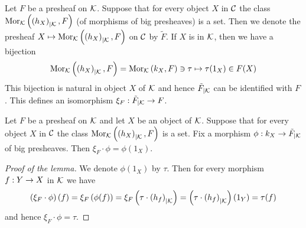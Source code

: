 \noindent
Let $F$ be a presheaf on ${\mathcal K}$. Suppose that for every object $X$ in ${\mathcal C}$ the class $\mathrm{Mor}_{{\mathcal K}}\left(\left(h_X\right)_{\mid {\mathcal K}},F\right)$ (of morphisms of big presheaves) is a set. Then we denote the presheaf $X\mapsto \mathrm{Mor}_{{\mathcal K}}\left(\left(h_X\right)_{\mid {\mathcal K}},F\right)$ on ${\mathcal C}$ by $\tilde{F}$. If $X$ is in ${\mathcal K}$, then we have a bijection
$$\mathrm{Mor}_{{\mathcal K}}\left(\left(h_X\right)_{\mid {\mathcal K}},F\right) = \mathrm{Mor}_{{\mathcal K}}\left(k_X , F\right)\ni \tau \mapsto \tau(1_X)\in F(X)$$
This bijection is natural in object $X$ of ${\mathcal K}$ and hence $\tilde{F}_{\mid {\mathcal K}}$ can be identified with $F$. This defines an isomorphism $\xi_F:\tilde{F}_{\mid {\mathcal K}}\rightarrow F$.

\begin{lemma}\label{lemma:counitandsection}
Let $F$ be a presheaf on ${\mathcal K}$ and let $X$ be an object of ${\mathcal K}$. Suppose that for every object $X$ in ${\mathcal C}$ the class $\mathrm{Mor}_{{\mathcal K}}\left(\left(h_X\right)_{\mid {\mathcal K}},F\right)$ is a set. Fix a morphism $\phi:k_X\rightarrow \tilde{F}_{\mid {\mathcal K}}$ of big presheaves. Then $\xi_F\cdot \phi = \phi(1_X)$.
\end{lemma}
\begin{proof}[Proof of the lemma]
We denote $\phi(1_X)$ by $\tau$. Then for every morphism $f:Y\rightarrow X$ in ${\mathcal K}$ we have
$$\left(\xi_{F}\cdot \phi\right)(f) = \xi_F\left(\phi(f)\right) = \xi_F\left(\tau\cdot \left(h_f\right)_{\mid {\mathcal K}}\right) = \left(\tau\cdot \left(h_f\right)_{\mid {\mathcal K}}\right)(1_Y) = \tau(f)$$
and hence $\xi_F\cdot \phi = \tau$.
\end{proof}

